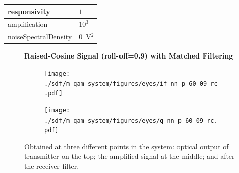 \begin{table}[H]
\begin{tabular}{|l|l|}
				responsivity           & $1$                                                        \\ \hline
				amplification          & $10^3$                                                     \\ \hline
				noiseSpectralDensity   & $0$~V$^2$                             					\\ \hline
	\end{tabular}
\end{table}
\begin{figure}[H]
	\centering
	\textbf{Raised-Cosine Signal (roll-off=0.9) with Matched Filtering}
	\begin{minipage}{\linewidth}
		\centering
	\begin{subfigure}{.45\textwidth}
		\centering
		\texttt{[image: ./sdf/m\_qam\_system/figures/eyes/if\_nn\_p\_60\_09\_rc.pdf]}
	\end{subfigure}
	\begin{subfigure}{.45\textwidth}
		\centering
		\texttt{[image: ./sdf/m\_qam\_system/figures/eyes/q\_nn\_p\_60\_09\_rc.pdf]}
	\end{subfigure}
	
	\caption{
		Obtained at
		three different points in the system: optical output of transmitter on the top;
		the amplified signal at the middle; and
		after the receiver filter.
		\label{fig:eyes_nn_rc_09}}
	\end{minipage}
\end{figure}

